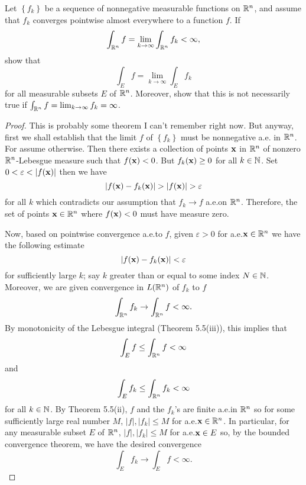 \begin{problem}
Let $\left\{f_k\right\}$ be a sequence of nonnegative measurable functions
on $\mathbb{R}^n$, and assume that $f_k$ converges pointwise almost everywhere to
a function $f$. If
\[
\int_{\mathbb{R}^n} f=\lim_{k\to\infty}\int_{\mathbb{R}^n} f_k<\infty,
\]
show that
\[
\int_E f=\lim_{k\to\infty}\int_E f_k
\]
for all measurable subsets $E$ of $\mathbb{R}^n$. Moreover, show that this is not
necessarily true if $\int_{\mathbb{R}^n} f=\lim_{k\to\infty} f_k=\infty$.
\end{problem}
\begin{proof}
This is probably some theorem I can't remember right now. But anyway, first
we shall establish that the limit $f$ of $\left\{f_k\right\}$ must be
nonnegative a.e. in $\mathbb{R}^n$. For assume otherwise. Then there exists a
collection of points $\mathbf{x}$ in $\mathbb{R}^n$ of nonzero $\mathbb{R}^n$-Lebesgue
measure such that $f(\mathbf{x})<0$. But $f_k(\mathbf{x})\geq 0$ for all
$k\in\mathbb{N}$. Set $0<\varepsilon<|f(\bfx)|$ then we have
\begin{equation}
\label{eq:estimate-contradiction-1}
|f(\bfx)-f_k(\bfx)|>|f(\bfx)|>\varepsilon
\end{equation}
for all $k$ which contradicts our assumption that $f_k\to f$ a.e.\@ on
$\mathbb{R}^n$. Therefore, the set of points $\mathbf{x}\in\mathbb{R}^n$ where $f(\mathbf{x})<0$
must have measure zero.

Now, based on pointwise convergence a.e.\@ to $f$, given $\varepsilon>0$
for a.e.\@ $\mathbf{x}\in\mathbb{R}^n$ we have the following estimate
\begin{equation}
\label{eq:estimate-2}
|f(\mathbf{x})-f_k(\mathbf{x})|<\varepsilon
\end{equation}
for sufficiently large $k$; say $k$ greater than or equal to some index
$N\in\mathbb{N}$. Moreover, we are given convergence in $L(\mathbb{R}^n)$ of $f_k$ to
$f$
\begin{equation}
\label{eq:integral-estimate-1}
\int_{\mathbb{R}^n}f_k\to\int_{\mathbb{R}^n}f<\infty.
\end{equation}
By monotonicity of the Lebesgue integral (Theorem 5.5(iii)), this implies
that
\begin{equation}
\label{eq:estimate-monotonicity-2}
\int_E f\leq\int_{\mathbb{R}^n} f<\infty
\end{equation}
and
\begin{equation}
\label{eq:estimate-monotonicity-k-2}
\int_E f_k\leq\int_{\mathbb{R}^n}f_k<\infty
\end{equation}
for all $k\in\mathbb{N}$. By Theorem 5.5(ii), $f$ and the $f_k$'s are finite
a.e.\@ in $\mathbb{R}^n$ so for some sufficiently large real number $M$,
$|f|,|f_k|\leq M$ for a.e.\@ $\mathbf{x}\in\mathbb{R}^n$. In particular, for any
measurable subset $E$ of $\mathbb{R}^n$, $|f|,|f_k|\leq M$ for a.e.\@ $\mathbf{x}\in E$
so, by the bounded convergence theorem, we have the desired convergence
\begin{equation}
\label{eq:desired-convergence-2}
\int_E f_k\to\int_E f<\infty.
\end{equation}


\end{proof}
